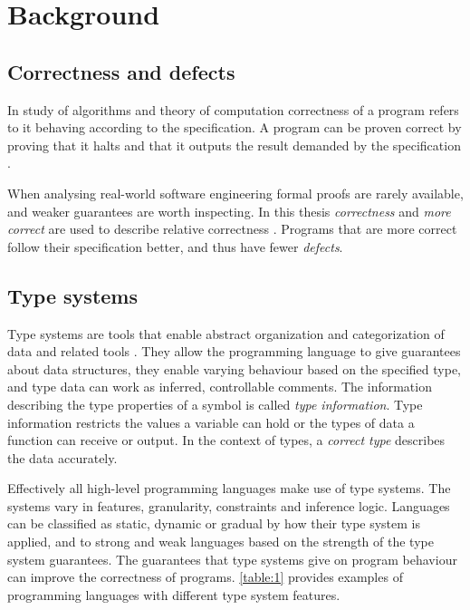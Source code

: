 \chapter{Background\label{background}}

\section{Correctness and defects}

In study of algorithms and theory of computation correctness of a program refers to it behaving according to the specification. A program can be proven correct by proving that it halts and that it outputs the result demanded by the specification \cite{manna_axiomatic_correctness_1974}.

When analysing real-world software engineering formal proofs are rarely available, and weaker guarantees are worth inspecting. In this thesis \emph{correctness} and \emph{more correct} are used to describe relative correctness \cite{diallo_relative_correctness_2015}. Programs that are more correct follow their specification better, and thus have fewer \emph{defects}.

\section{Type systems}

Type systems are tools that enable abstract organization and categorization of data and related tools \cite{programming_langs}. They allow the programming language to give guarantees about data structures, they enable varying behaviour based on the specified type, and type data can work as inferred, controllable comments. The information describing the type properties of a symbol is called \emph{type information}. Type information restricts the values a variable can hold or the types of data a function can receive or output. In the context of types, a \emph{correct type} describes the data accurately.

Effectively all high-level programming languages make use of type systems. The systems vary in features, granularity, constraints and inference logic. Languages can be classified as static, dynamic or gradual by how their type system is applied, and to strong and weak languages based on the strength of the type system guarantees. The guarantees that type systems give on program behaviour can improve the correctness of programs. \ref{table:1} provides examples of programming languages with different type system features.

